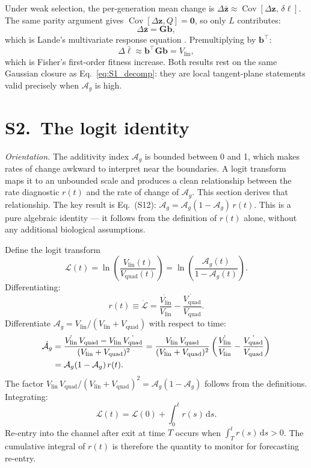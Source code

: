\documentclass[11pt]{article}
\newcommand{\vect}[1]{\boldsymbol{#1}}
\newcommand{\mat}[1]{\mathbf{#1}}
\newcommand{\Ag}{\mathcal{A}_{g}}
\newcommand{\CalL}{\mathcal{L}}
\newcommand{\Vlin}{V_{\mathrm{lin}}}
\newcommand{\Vquad}{V_{\mathrm{quad}}}
\newcommand{\Cov}{\operatorname{Cov}}
\begin{document}
Under weak selection, the per-generation mean change is
$\Delta\bar{\vect{z}} \approx \Cov[\Delta\vect{z},\,\delta\ell]$.
The same parity argument gives
$\Cov[\Delta\vect{z},Q] = \vect{0}$, so only $L$ contributes:
\begin{equation}
\Delta\bar{\vect{z}} = \mat{G}\vect{b},
\label{eq:S1_lande}
\end{equation}
which is Lande's multivariate response equation \cite{Lande1979}.
Premultiplying by $\vect{b}^\top$:
\begin{equation}
\Delta\bar{\ell}
\approx \vect{b}^\top\mat{G}\vect{b}
= \Vlin,
\label{eq:S1_fisher}
\end{equation}
which is Fisher's first-order fitness increase.
Both results rest on the same Gaussian closure as
Eq.~\eqref{eq:S1_decomp}: they are local tangent-plane statements
valid precisely when $\Ag$ is high.

\section*{S2.~The logit identity}
\label{sec:logit}

\noindent\textit{Orientation.}
The additivity index $\Ag$ is bounded between 0 and 1, which
makes rates of change awkward to interpret near the boundaries.
A logit transform maps it to an unbounded scale and produces a
clean relationship between the rate diagnostic $r(t)$ and the
rate of change of $\Ag$.
This section derives that relationship.
The key result is Eq.~(S12): $\dot{\Ag} = \Ag(1-\Ag)\,r(t)$.
This is a pure algebraic identity --- it follows from the
definition of $r(t)$ alone, without any additional biological
assumptions.

Define the logit transform
\begin{equation}
\CalL(t) = \ln\!\left(\frac{\Vlin(t)}{\Vquad(t)}\right)
          = \ln\!\left(\frac{\Ag(t)}{1-\Ag(t)}\right).
\label{eq:S2_logit}
\end{equation}
Differentiating:
\begin{equation}
r(t) \equiv \dot{\CalL}
= \frac{\dot{\Vlin}}{\Vlin} - \frac{\dot{\Vquad}}{\Vquad}.
\label{eq:S2_r_def}
\end{equation}
Differentiate $\Ag = \Vlin/(\Vlin+\Vquad)$ with respect to time:
\begin{align}
\dot{\Ag}
&= \frac{\dot{\Vlin}\,\Vquad - \Vlin\,\dot{\Vquad}}
        {(\Vlin+\Vquad)^2}
 = \frac{\Vlin\,\Vquad}{(\Vlin+\Vquad)^2}
   \left(\frac{\dot{\Vlin}}{\Vlin}-\frac{\dot{\Vquad}}{\Vquad}\right)
\notag \\
&= \Ag(1-\Ag)\,r(t).
\label{eq:S2_logistic}
\end{align}
The factor $\Vlin\,\Vquad/(\Vlin+\Vquad)^2 = \Ag(1-\Ag)$
follows from the definitions.
Integrating:
\begin{equation}
\CalL(t) = \CalL(0) + \int_0^t r(s)\,\mathrm{d}s.
\label{eq:S2_integral}
\end{equation}
Re-entry into the channel after exit at time $T$ occurs when
$\int_T^t r(s)\,\mathrm{d}s > 0$.
The cumulative integral of $r(t)$ is therefore the quantity to
monitor for forecasting re-entry.
\end{document}
